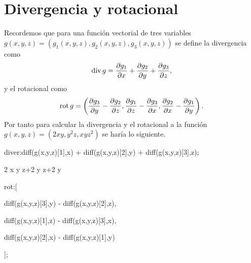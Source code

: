 \section{Divergencia y rotacional}
Recordemos que para una función vectorial de tres variables
$g(x,y,z) = (g_1(x,y,z), g_2(x,y,z), g_3(x,y,z))$
se define la divergencia como
\begin{equation*}
 \operatorname{div} g =
 \frac{\partial g_1}{\partial x}
 +\frac{\partial g_2}{\partial y}
 +\frac{\partial g_3}{\partial z},
\end{equation*}
y el rotacional como
\begin{equation*}
 \operatorname{rot} g =
 \left(
 \frac{\partial g_3}{\partial y}
 -\frac{\partial g_2}{\partial z},
 \frac{\partial g_1}{\partial z}
 -\frac{\partial g_3}{\partial x},
 \frac{\partial g_2}{\partial x}
 -\frac{\partial g_1}{\partial y}
 \right).
\end{equation*}
Por tanto para calcular la divergencia y el rotacional
a la función
$g(x,y,z) = (2xy, y^2z, xyz^2)$
se haría lo siguiente.
\begin{maximai}
 diver:diff(g(x,y,z)[1],x) + diff(g(x,y,z)[2],y) + diff(g(x,y,z)[3],z);
\end{maximai}
\begin{maximao}
 2 x y z+2 y z+2 y
\end{maximao}
\begin{maximai}
 rot:[
\end{maximai} \begin{maximal}
  diff(g(x,y,z)[3],y) - diff(g(x,y,z)[2],z),
\end{maximal} \begin{maximal}
  diff(g(x,y,z)[1],z) - diff(g(x,y,z)[3],x),
\end{maximal} \begin{maximal}
  diff(g(x,y,z)[2],x) - diff(g(x,y,z)[1],y)
\end{maximal} \begin{maximal}
 ];
\end{maximal}
\begin{maximao}
\end{maximao}
